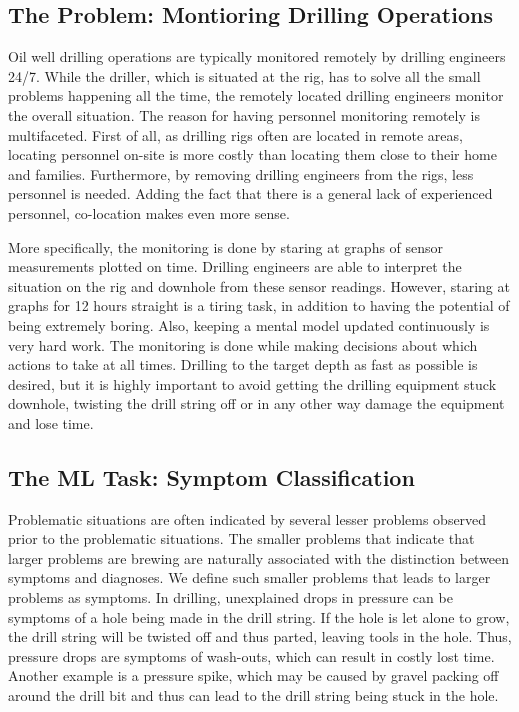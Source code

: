 \documentclass{article}
\theoremstyle{theorem}
\theoremstyle{definition}
\begin{document}
\subsection{The Problem: Montioring Drilling Operations}
Oil well drilling operations are typically monitored remotely by drilling engineers 24/7.
While the driller, which is situated at the rig, has to solve all the small problems happening all the time, the remotely located drilling engineers monitor the overall situation.
The reason for having personnel monitoring remotely is multifaceted.
First of all, as drilling rigs often are located in remote areas, locating personnel on-site is more costly than locating them close to their home and families.
Furthermore, by removing drilling engineers from the rigs, less personnel is needed.
Adding the fact that there is a general lack of experienced personnel, co-location makes even more sense.

More specifically, the monitoring is done by staring at graphs of sensor measurements plotted on time.
Drilling engineers are able to interpret the situation on the rig and downhole from these sensor readings.
However, staring at graphs for 12 hours straight is a tiring task, in addition to having the potential of being extremely boring.
Also, keeping a mental model updated continuously is very hard work.
The monitoring is done while making decisions about which actions to take at all times.
Drilling to the target depth as fast as possible is desired, but it is highly important to avoid getting the drilling equipment stuck downhole, twisting the drill string off or in any other way damage the equipment and lose time. 

\subsection{The ML Task: Symptom Classification}
Problematic situations are often indicated by several lesser problems observed prior to the problematic situations.
The smaller problems that indicate that larger problems are brewing are naturally associated with the distinction between symptoms and diagnoses.
We define such smaller problems that leads to larger problems as symptoms.
In drilling, unexplained drops in pressure can be symptoms of a hole being made in the drill string.
If the hole is let alone to grow, the drill string will be twisted off and thus parted, leaving tools in the hole.
Thus, pressure drops are symptoms of wash-outs, which can result in costly lost time.
Another example is a pressure spike, which may be caused by gravel packing off around the drill bit and thus can lead to the drill string being stuck in the hole.
\end{document}
